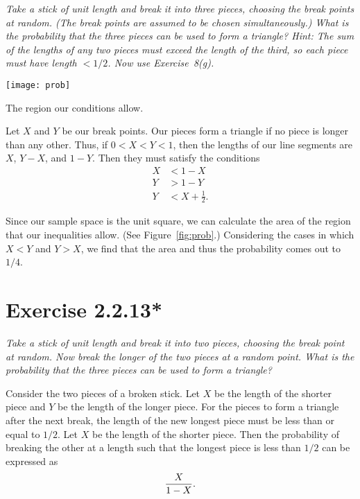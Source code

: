 \documentclass{tufte-handout}
\begin{document}
\emph{Take a stick of unit length and break it into three pieces,
  choosing the break points at random. (The break points are assumed
  to be chosen simultaneously.) What is the probability that the three
  pieces can be used to form a triangle? \emph{Hint}: The sum of the
  lengths of any two pieces must exceed the length of the third, so
  each piece must have length $< 1/2$. Now use Exercise~8(g).}

\bigskip

\begin{marginfigure}
  \texttt{[image: prob]}
  \caption{The region our conditions allow.}
  \label{fig:prob}
\end{marginfigure}

Let $X$ and $Y$ be our break points. Our pieces form a triangle if no
piece is longer than any other. Thus, if $0<X<Y<1$, then the lengths
of our line segments are $X$, $Y-X$, and $1-Y$. Then they must satisfy
the conditions
\begin{align*}
  X &< 1 - X \\
  Y &> 1 - Y \\
  Y &< X + \frac{1}{2}.
\end{align*}

Since our sample space is the unit square, we can calculate the area
of the region that our inequalities allow. (See
Figure~\ref{fig:prob}.) Considering the cases in which $X<Y$ and
$Y>X$, we find that the area and thus the probability comes out to
$1/4$.

\section{Exercise 2.2.13*}

\emph{Take a stick of unit length and break it into two pieces,
  choosing the break point at random. Now break the longer of the two
  pieces at a random point. What is the probability that the three
  pieces can be used to form a triangle?}

\bigskip

Consider the two pieces of a broken stick. Let $X$ be the length of
the shorter piece and $Y$ be the length of the longer piece. For the
pieces to form a triangle after the next break, the length of the new
longest piece must be less than or equal to $1/2$. Let $X$ be the
length of the shorter piece. Then the probability of breaking the
other at a length such that the longest piece is less than $1/2$ can
be expressed as%
\[ {X \over 1 - X}. \]
\end{document}
